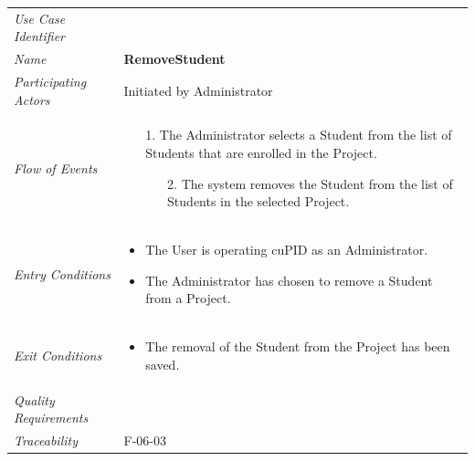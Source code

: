 \documentclass[12pt,letterpaper]{article}
\begin{document}
\begin{center}
	\begin{tabu} to 
		\toprule
		Use Case Identifier & \removestudent{} \\
		Name & {\bf RemoveStudent} \\
		Participating Actors & Initiated by Administrator \\
		Flow of Events & 
		\begin{minipage}[t]{\linewidth}
		    \begin{enumerate}
			    \item[1.] The Administrator selects a Student from the list of Students that are enrolled in the Project.
			    \begin{enumerate} 
			    	\item[2.] The system removes the Student from the list of Students in the selected Project.
			    \end{enumerate}
			\end{enumerate}
		\end{minipage} \\

		Entry Conditions &
		\begin{minipage}[t]{\linewidth}
			\begin{itemize}
			    \item The User is operating cuPID as an Administrator.
			    \item The Administrator has chosen to remove a Student from a Project.
	        \end{itemize}
		\end{minipage} \\

		Exit Conditions &
		\begin{minipage}[t]{\linewidth}
			\begin{itemize}
			    \item The removal of the Student from the Project has been saved.
	        \end{itemize}
		\end{minipage} \\

		Quality Requirements & \\

		Traceability & F-06-03 \\
		\toprule
	\end{tabu}
\end{center}
\end{document}
